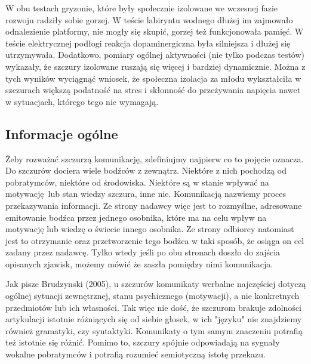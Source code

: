 \documentclass{psychol}
\begin{document}
W obu testach gryzonie, które były społecznie izolowane we wczesnej fazie rozwoju radziły sobie gorzej. W teście labiryntu wodnego dłużej im zajmowało odnalezienie platformy, nie mogły się skupić, gorzej też funkcjonowała pamięć. W teście elektrycznej podłogi reakcja dopaminergiczna była silniejsza i dłużej się utrzymywała. Dodatkowo, pomiary ogólnej aktywności (nie tylko podczas testów) wykazały, że szczury izolowane ruszają się więcej i bardziej dynamicznie. Można z tych wyników wyciągnąć wniosek, że społeczna izolacja za młodu wykształciła w szczurach większą podatność na stres i skłonność do przeżywania napięcia nawet w sytuacjach, którego tego nie wymagają.


\subsection{Informacje ogólne}

Żeby rozważać szczurzą komunikację, zdefiniujmy najpierw co to pojęcie oznacza. Do szczurów dociera wiele bodźców z zewnątrz. Niektóre z nich pochodzą od pobratymców, niektóre od środowiska. Niektóre są w stanie wpływać na motywację lub stan wiedzy szczura, inne nie. Komunikacją nazwiemy proces przekazywania informacji. Ze strony nadawcy więc jest to rozmyślne, adresowane emitowanie bodźca przez jednego osobnika, które ma na celu wpływ na motywację lub wiedzę o świecie innego osobnika. Ze strony odbiorcy natomiast jest to otrzymanie oraz przetworzenie tego bodźca w taki sposób, że osiąga on cel zadany przez nadawcę. Tylko wtedy jeśli po obu stronach doszło do zajścia opisanych zjawisk, możemy mówić że zaszła pomiędzy nimi komunikacja.

Jak pisze Brudzynski (2005), u szczurów komunikaty werbalne najczęściej dotyczą ogólnej sytuacji zewnętrznej, stanu psychicznego (motywacji), a nie konkretnych przedmiotów lub ich własności. Tak więc nie dość, że szczurom brakuje zdolności artykulacji istotnie różniących się od siebie głosek, w ich "języku" nie znajdziemy również gramatyki, czy syntaktyki. Komunikaty o tym samym znaczeniu potrafią też istotnie się różnić. Pomimo to, szczury spójnie odpowiadają na sygnały wokalne pobratymców i potrafią rozumieć semiotyczną istotę przekazu.
\end{document}
